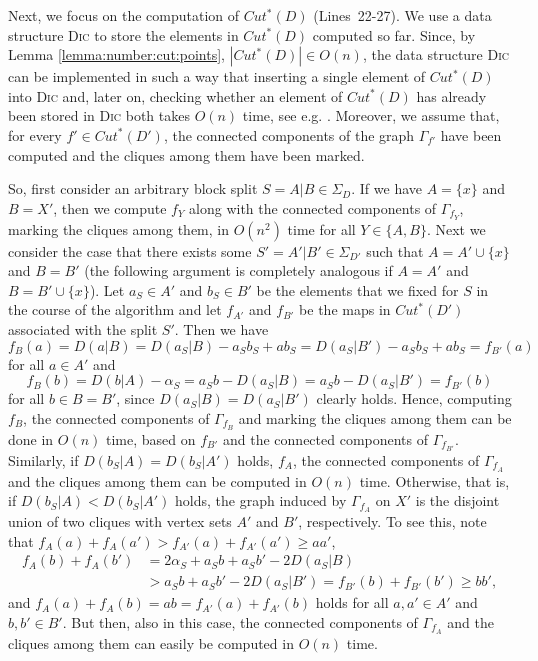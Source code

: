 \documentclass[12pt]{article}
\begin{document}
Next, we focus on the computation of \(Cut^*(D)\) (Lines~22-27).
We use a data structure \textsc{Dic}
to store the elements in \(Cut^*(D)\) computed so far. 
Since, by Lemma \ref{lemma:number:cut:points},
\(|Cut^*(D)| \in O(n)\), the data structure \textsc{Dic} can be implemented in such a way
that inserting a single element of \(Cut^*(D)\) into \textsc{Dic} and, later on, 
checking whether an element of \(Cut^*(D)\) has
already been stored in \textsc{Dic} both takes \(O(n)\) time, see e.g. \cite{gon-00a}.
Moreover, we assume that, for every \(f' \in Cut^*(D')\),
the connected components of the graph \(\Gamma_{f'}\) have been computed
and the cliques among them have been marked. 

So, first consider an arbitrary block split \(S = A|B \in \Sigma_D\).
If we have \(A=\{x\}\) and \(B=X'\), then
we compute \(f_Y\) along with the connected components of \(\Gamma_{f_Y}\),
marking the cliques among them, in \(O(n^2)\) time for all \(Y \in \{A,B\}\). 
Next we consider the case that there exists some \(S' = A'|B' \in \Sigma_{D'}\)
such that \(A = A' \cup \{x\}\) and \(B = B'\) (the following argument is completely 
analogous if \(A = A'\) and \(B = B' \cup \{x\}\)).
Let \(a_S \in A'\) and \(b_S \in B'\) be the elements that we fixed
for \(S\) in the course of the algorithm and
let \(f_{A'}\) and \(f_{B'}\) be the maps in \(Cut^*(D')\)
associated with the split \(S'\).
Then we have 
\[f_B(a) = D(a|B) = D(a_S|B) - a_Sb_S + ab_S = D(a_S|B') - a_Sb_S + ab_S = f_{B'}(a)\] 
for all \(a \in A'\) and
\[f_B(b) = D(b|A) - \alpha_S = a_Sb - D(a_S|B) = a_Sb - D(a_S|B') = f_{B'}(b)\]
for all \(b \in B = B'\), since \(D(a_S|B) = D(a_S|B')\) clearly holds.
Hence, computing \(f_B\), the connected components of \(\Gamma_{f_B}\) 
and marking the cliques among them can be done in \(O(n)\) time, based on 
\(f_{B'}\) and the connected components of \(\Gamma_{f_{B'}}\).
Similarly, if \(D(b_S|A) = D(b_S|A')\) holds,
\(f_A\), the connected components of \(\Gamma_{f_A}\)
and the cliques among them can be computed in \(O(n)\) time.
Otherwise, that is, if \(D(b_S|A) < D(b_S|A')\) holds,
the graph induced by \(\Gamma_{f_A}\)
on \(X'\) is the disjoint union of two cliques
with vertex sets \(A'\) and \(B'\), respectively. 
To see this, note that
\(f_A(a) + f_A(a')  > f_{A'}(a) + f_{A'}(a') \geq aa'\),
\begin{align*}
f_A(b) + f_A(b')  &= 2\alpha_S + a_Sb + a_Sb' - 2 D(a_S|B) \\
                  &> a_Sb + a_Sb' - 2 D(a_S|B') = f_{B'}(b) + f_{B'}(b') \geq bb',
\end{align*} 
and \(f_A(a) + f_A(b) = ab = f_{A'}(a) + f_{A'}(b)\)
holds for all \(a,a' \in A'\) and \(b,b' \in B'\).
But then, also in this case, the connected components of \(\Gamma_{f_A}\)
and the cliques among them can easily be computed in \(O(n)\) time.
\end{document}
